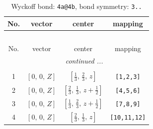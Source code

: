 \documentclass[fleqn,8pt]{jsarticle}
\begin{document}
\renewcommand{\arraystretch}{1.2}
\begin{longtable}{cccc}
\caption{Wyckoff bond: {\tt 4a@4b}, bond symmetry: {\tt 3..}}
 \\
 \hline \hline
No. & vector & center & mapping \\ \hline \endfirsthead

\multicolumn{3}{l}{\tablename\ \thetable{}} \\
 \hline \hline
No. & vector & center & mapping \\ \hline \endhead

 \hline \hline
\multicolumn{3}{r}{\footnotesize\it continued ...} \\ \endfoot

 \hline \hline
\multicolumn{3}{r}{} \\ \endlastfoot

1 & $\left[ 0,\, 0,\, Z \right]$ & $\left[ \frac{1}{3},\, \frac{2}{3},\, z \right]$ & {\tt [1,2,3]} \\ \hline
2 & $\left[ 0,\, 0,\, Z \right]$ & $\left[ \frac{2}{3},\, \frac{1}{3},\, z + \frac{1}{2} \right]$ & {\tt [4,5,6]} \\ \hline
3 & $\left[ 0,\, 0,\, Z \right]$ & $\left[ \frac{1}{3},\, \frac{2}{3},\, z + \frac{1}{2} \right]$ & {\tt [7,8,9]} \\ \hline
4 & $\left[ 0,\, 0,\, Z \right]$ & $\left[ \frac{2}{3},\, \frac{1}{3},\, z \right]$ & {\tt [10,11,12]} \\
\end{longtable}
\renewcommand{\arraystretch}{1.2}
\end{document}
